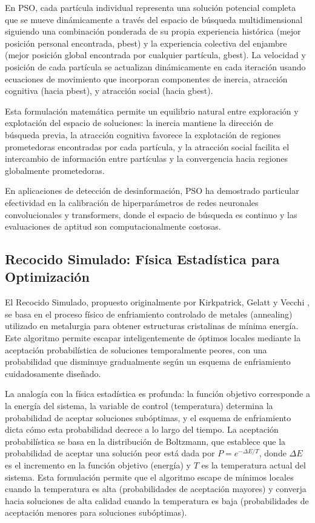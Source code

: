 En PSO, cada partícula individual representa una solución potencial completa que se mueve dinámicamente a través del espacio de búsqueda multidimensional siguiendo una combinación ponderada de su propia experiencia histórica (mejor posición personal encontrada, pbest) y la experiencia colectiva del enjambre (mejor posición global encontrada por cualquier partícula, gbest). La velocidad y posición de cada partícula se actualizan dinámicamente en cada iteración usando ecuaciones de movimiento que incorporan componentes de inercia, atracción cognitiva (hacia pbest), y atracción social (hacia gbest).

Esta formulación matemática permite un equilibrio natural entre exploración y explotación del espacio de soluciones: la inercia mantiene la dirección de búsqueda previa, la atracción cognitiva favorece la explotación de regiones prometedoras encontradas por cada partícula, y la atracción social facilita el intercambio de información entre partículas y la convergencia hacia regiones globalmente prometedoras.

En aplicaciones de detección de desinformación, PSO ha demostrado particular efectividad en la calibración de hiperparámetros de redes neuronales convolucionales y transformers, donde el espacio de búsqueda es continuo y las evaluaciones de aptitud son computacionalmente costosas.

\subsection{Recocido Simulado: Física Estadística para Optimización}

El Recocido Simulado, propuesto originalmente por Kirkpatrick, Gelatt y Vecchi \cite{kirkpatrick1983optimization}, se basa en el proceso físico de enfriamiento controlado de metales (annealing) utilizado en metalurgia para obtener estructuras cristalinas de mínima energía. Este algoritmo permite escapar inteligentemente de óptimos locales mediante la aceptación probabilística de soluciones temporalmente peores, con una probabilidad que disminuye gradualmente según un esquema de enfriamiento cuidadosamente diseñado.

La analogía con la física estadística es profunda: la función objetivo corresponde a la energía del sistema, la variable de control (temperatura) determina la probabilidad de aceptar soluciones subóptimas, y el esquema de enfriamiento dicta cómo esta probabilidad decrece a lo largo del tiempo. La aceptación probabilística se basa en la distribución de Boltzmann, que establece que la probabilidad de aceptar una solución peor está dada por $P = e^{-\Delta E / T}$, donde $\Delta E$ es el incremento en la función objetivo (energía) y $T$ es la temperatura actual del sistema. Esta formulación permite que el algoritmo escape de mínimos locales cuando la temperatura es alta (probabilidades de aceptación mayores) y converja hacia soluciones de alta calidad cuando la temperatura es baja (probabilidades de aceptación menores para soluciones subóptimas).

